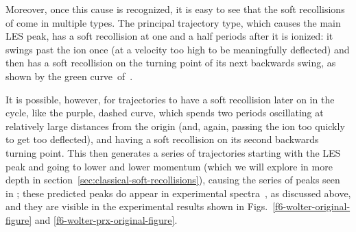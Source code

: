 Moreover, once this cause is recognized, it is easy to see that the soft recollisions of  come in multiple types. The principal trajectory type, which causes the main LES peak, has a soft recollision at one and a half periods after it is ionized: it swings past the ion once (at a velocity too high to be meaningfully deflected) and then has a soft recollision on the turning point of its next backwards swing, as shown by the green curve~of~.




It is possible, however, for trajectories to have a soft recollision later on in the cycle, like the purple, dashed curve, which spends two periods oscillating at relatively large distances from the origin (and, again, passing the ion too quickly to get too deflected), and having a soft recollision on its second backwards turning point. This then generates a series of trajectories starting with the LES peak and going to lower and lower momentum (which we will explore in more depth in section~\ref{sec:classical-soft-recollisions}), causing the series of peaks seen in ; these predicted peaks do appear in experimental spectra~\cite{ZES_paper, Wolter_PRX}, as discussed above, and they are visible in the experimental results shown in Figs.~\ref{f6-wolter-original-figure} and \ref{f6-wolter-prx-original-figure}.

